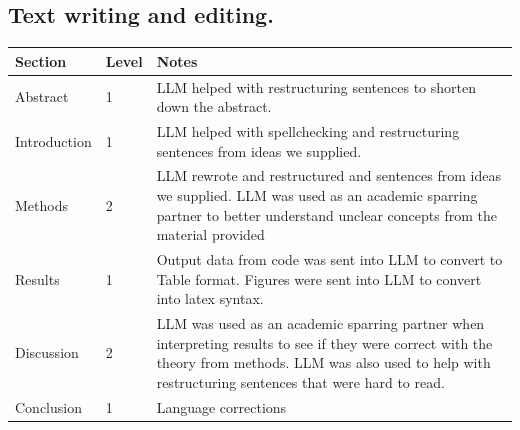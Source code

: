 \documentclass[reprint,english,notitlepage]{revtex4-2}  %
\begin{document}
\subsection{\textbf{Text writing and editing.}}
\begin{tabular}{llp{11cm}}
Section & Level & Notes\\ \hline
Abstract & 1 & LLM helped with restructuring sentences to shorten down the abstract. \\
Introduction & 1 &  LLM helped with spellchecking and restructuring sentences from ideas we supplied. \\
Methods & 2 & LLM rewrote and restructured and sentences from ideas we supplied. LLM was used as an academic sparring partner to better understand unclear concepts from the material provided  \\
Results & 1 & Output data from code was sent into LLM to convert to Table format. Figures were sent into LLM to convert into latex syntax.  \\
Discussion & 2 & LLM was used as an academic sparring partner when interpreting results to see if they were correct with the theory from methods. LLM was also used to help with restructuring sentences that were hard to read. \\
Conclusion & 1 & Language corrections \\
\end{tabular}
\end{document}
